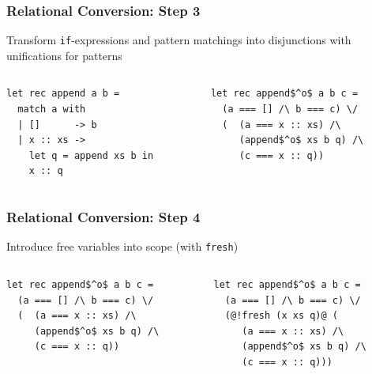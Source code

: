 \documentclass[xcolor=table]{beamer}
\begin{document}
\begin{frame}[fragile]
  \transwipe[direction=90]
  \frametitle{Relational Conversion: Step 3}
  
Transform \lstinline{if}-expressions and pattern matchings into disjunctions with unifications for patterns

\begin{columns}
\begin{column}{0.5\textwidth}
\begin{lstlisting}
let rec append a b =
  match a with 
  | []      -> b
  | x :: xs -> 
    let q = append xs b in
    x :: q
\end{lstlisting}
\end{column}
\begin{column}{0.5\textwidth}  
\begin{lstlisting}
let rec append$^o$ a b c =
  (a === [] /\ b === c) \/
  (  (a === x :: xs) /\
     (append$^o$ xs b q) /\
     (c === x :: q))
\end{lstlisting}
\end{column}
\end{columns}
\end{frame}

\begin{frame}[fragile]
  \transwipe[direction=90]
  \frametitle{Relational Conversion: Step 4}

Introduce free variables into scope  (with \lstinline{fresh})

\begin{columns}
\begin{column}{0.5\textwidth}
\begin{lstlisting}
let rec append$^o$ a b c =
  (a === [] /\ b === c) \/
  (  (a === x :: xs) /\
     (append$^o$ xs b q) /\
     (c === x :: q))
\end{lstlisting}
\end{column}
\begin{column}{0.5\textwidth}  
\begin{lstlisting}
let rec append$^o$ a b c =
  (a === [] /\ b === c) \/
  (@!fresh (x xs q)@ (
     (a === x :: xs) /\
     (append$^o$ xs b q) /\
     (c === x :: q)))
\end{lstlisting}
\end{column}
\end{columns}
\end{frame}
\end{document}
